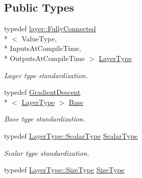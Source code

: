 \subsection*{Public Types}
\begin{DoxyCompactItemize}
\item 
typedef \hyperlink{classffnn_1_1layer_1_1_fully_connected}{layer\-::\-Fully\-Connected}\\*
$<$ Value\-Type, \\*
Inputs\-At\-Compile\-Time, \\*
Outputs\-At\-Compile\-Time $>$ \hyperlink{classffnn_1_1optimizer_1_1_adam_3_01layer_1_1_fully_connected_3_01_value_type_00_01_inputs_at_co08ce471fd3ee7441a350cc42cfd35bcd_ad82ece03afb695075874eaed356433d2}{Layer\-Type}
\begin{DoxyCompactList}\small\item\em Layer type standardization. \end{DoxyCompactList}\item 
typedef \hyperlink{classffnn_1_1optimizer_1_1_gradient_descent}{Gradient\-Descent}\\*
$<$ \hyperlink{classffnn_1_1optimizer_1_1_adam_3_01layer_1_1_fully_connected_3_01_value_type_00_01_inputs_at_co08ce471fd3ee7441a350cc42cfd35bcd_ad82ece03afb695075874eaed356433d2}{Layer\-Type} $>$ \hyperlink{classffnn_1_1optimizer_1_1_adam_3_01layer_1_1_fully_connected_3_01_value_type_00_01_inputs_at_co08ce471fd3ee7441a350cc42cfd35bcd_aa039b3368a2997e3437a32da6ef4a373}{Base}
\begin{DoxyCompactList}\small\item\em Base type standardization. \end{DoxyCompactList}\item 
typedef \hyperlink{classffnn_1_1layer_1_1_fully_connected_ac3ff6f72846f84f89c0d6e10f138c7e3}{Layer\-Type\-::\-Scalar\-Type} \hyperlink{classffnn_1_1optimizer_1_1_adam_3_01layer_1_1_fully_connected_3_01_value_type_00_01_inputs_at_co08ce471fd3ee7441a350cc42cfd35bcd_a3cd3f5a825a36308f81ff39f9dd51dd1}{Scalar\-Type}
\begin{DoxyCompactList}\small\item\em Scalar type standardization. \end{DoxyCompactList}\item 
typedef \hyperlink{classffnn_1_1layer_1_1_fully_connected_ae1b5e64828482a4c3eea0e2b0ba3f826}{Layer\-Type\-::\-Size\-Type} \hyperlink{classffnn_1_1optimizer_1_1_adam_3_01layer_1_1_fully_connected_3_01_value_type_00_01_inputs_at_co08ce471fd3ee7441a350cc42cfd35bcd_a6bbc6e181e5a5192b7b5cc42e3172372}{Size\-Type}

\end{DoxyCompactItemize}
